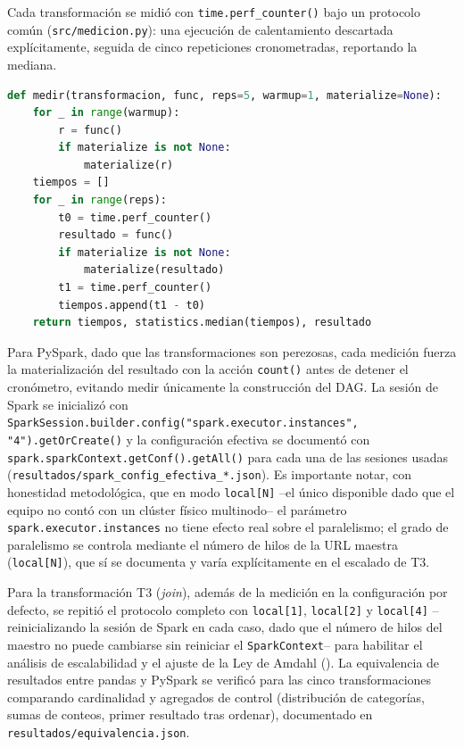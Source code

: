 \documentclass[11pt,a4paper]{article}
\begin{document}
    Cada transformación se midió con \texttt{time.perf\_counter()} bajo un protocolo común
    (\texttt{src/medicion.py}): una ejecución de calentamiento descartada explícitamente, seguida de
    cinco repeticiones cronometradas, reportando la mediana.

    \begin{lstlisting}[language=Python,caption={Protocolo de medición común a pandas y PySpark (\texttt{src/medicion.py}).},label={lst:medicion}]
def medir(transformacion, func, reps=5, warmup=1, materialize=None):
    for _ in range(warmup):
        r = func()
        if materialize is not None:
            materialize(r)
    tiempos = []
    for _ in range(reps):
        t0 = time.perf_counter()
        resultado = func()
        if materialize is not None:
            materialize(resultado)
        t1 = time.perf_counter()
        tiempos.append(t1 - t0)
    return tiempos, statistics.median(tiempos), resultado
    \end{lstlisting}

    Para PySpark, dado que las transformaciones son perezosas, cada medición fuerza la
    materialización del resultado con la acción \texttt{count()} antes de detener el cronómetro,
    evitando medir únicamente la construcción del DAG. La sesión de Spark se inicializó con
    \texttt{SparkSession.builder.config("spark.executor.instances", "4").getOrCreate()} y la
    configuración efectiva se documentó con \texttt{spark.sparkContext.getConf().getAll()} para cada
    una de las sesiones usadas (\texttt{resultados/spark\_config\_efectiva\_*.json}). Es importante
    notar, con honestidad metodológica, que en modo \texttt{local[N]} --el único disponible dado que
    el equipo no contó con un clúster físico multinodo-- el parámetro
    \texttt{spark.executor.instances} no tiene efecto real sobre el paralelismo; el grado de
    paralelismo se controla mediante el número de hilos de la URL maestra (\texttt{local[N]}), que sí
    se documenta y varía explícitamente en el escalado de T3.

    Para la transformación T3 (\emph{join}), además de la medición en la configuración por defecto,
    se repitió el protocolo completo con \texttt{local[1]}, \texttt{local[2]} y \texttt{local[4]}
    --reinicializando la sesión de Spark en cada caso, dado que el número de hilos del maestro no
    puede cambiarse sin reiniciar el \texttt{SparkContext}-- para habilitar el análisis de
    escalabilidad y el ajuste de la Ley de Amdahl (). La equivalencia de
    resultados entre pandas y PySpark se verificó para las cinco transformaciones comparando
    cardinalidad y agregados de control (distribución de categorías, sumas de conteos, primer
    resultado tras ordenar), documentado en \texttt{resultados/equivalencia.json}.
\end{document}
